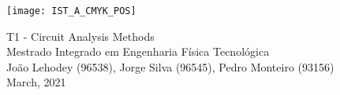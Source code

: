 
\thispagestyle {empty}

\texttt{[image: IST\_A\_CMYK\_POS]}

\begin{center}
%
\vspace{1.0cm}

\vspace{0.75cm}
{\FontLb T1 - Circuit Analysis Methods} \\ %
\vspace{0.75cm}
{\FontSn Mestrado Integrado em Engenharia Física Tecnológica} \\ %
\vspace{0.75cm}
{\FontSn João Lehodey (96538), Jorge Silva (96545), Pedro Monteiro (93156) } \\
\vspace{0.75cm}
{\FontSn March, 2021} \\ %
%
\end{center}

